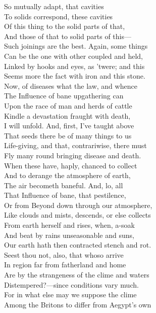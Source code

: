 So mutually adapt, that cavities\\
To solids correspond, these cavities\\
Of this thing to the solid parts of that,\\
And those of that to solid parts of this—\\
Such joinings are the best. Again, some things\\
Can be the one with other coupled and held,\\
Linked by hooks and eyes, as 'twere; and this\\
Seems more the fact with iron and this stone.\\
Now, of diseases what the law, and whence\\
The Influence of bane upgathering can\\
Upon the race of man and herds of cattle\\
Kindle a devastation fraught with death,\\
I will unfold. And, first, I've taught above\\
That seeds there be of many things to us\\
Life-giving, and that, contrariwise, there must\\
Fly many round bringing disease and death.\\
When these have, haply, chanced to collect\\
And to derange the atmosphere of earth,\\
The air becometh baneful. And, lo, all\\
That Influence of bane, that pestilence,\\
Or from Beyond down through our atmosphere,\\
Like clouds and mists, descends, or else collects\\
From earth herself and rises, when, a-soak\\
And beat by rains unseasonable and suns,\\
Our earth hath then contracted stench and rot.\\
Seest thou not, also, that whoso arrive\\
In region far from fatherland and home\\
Are by the strangeness of the clime and waters\\
Distempered?—since conditions vary much.\\
For in what else may we suppose the clime\\
Among the Britons to differ from Aegypt's own\\
